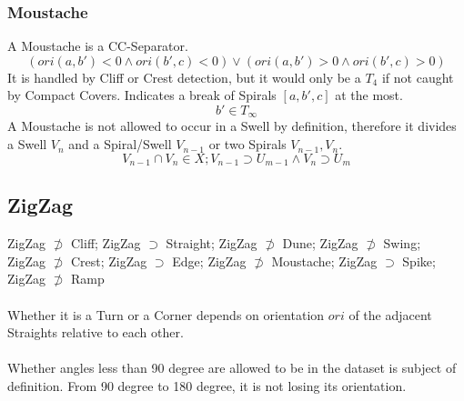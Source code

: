 \documentclass{report}
\begin{document}
\subsubsection{Moustache}
A Moustache is a CC-Separator.
\begin{equation}
(ori(a,b')<0\land ori(b',c)<0)\lor (ori(a,b')>0\land ori(b',c)>0)
\end{equation}
It is handled by Cliff or Crest detection, but it would only be a $T_{4}$ if not caught by Compact Covers. Indicates a break of Spirals $[a,b',c]$ at the most.
\begin{equation}
b' \in T_{\infty}
\end{equation}
A Moustache is not allowed to occur in a Swell by definition, therefore it divides a Swell $V_{n}$ and a Spiral/Swell $V_{n-1}$ or two Spirals $V_{n-1},V_{n}$.
\begin{equation}
V_{n-1}\cap V_{n}\in X; V_{n-1}\supset U_{m-1}\land V_{n}\supset U_{m}
\end{equation}

\subsection{ZigZag}
ZigZag $\not\supset$ Cliff; ZigZag $\supset$ Straight; ZigZag $\not\supset$ Dune; ZigZag $\not\supset$ Swing;\\ ZigZag $\not\supset$ Crest; ZigZag $\supset$ Edge; ZigZag $\not \supset$ Moustache; ZigZag $\supset$ Spike; ZigZag $\not \supset$ Ramp\\\\
Whether it is a Turn or a Corner depends on orientation $ori$ of the adjacent Straights relative to each other.\\\\
Whether angles less than 90 degree are allowed to be in the dataset is subject of definition.
From 90 degree to 180 degree, it is not losing its orientation.
\end{document}

